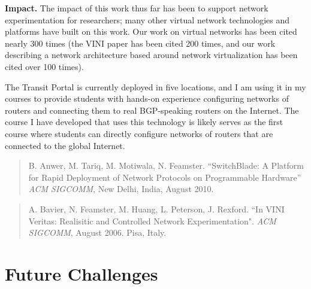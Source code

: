 {\bf Impact.}  The impact of this work thus far has been to support
network experimentation for researchers; many other virtual network
technologies and platforms have built on this work. Our work on virtual
networks has been cited nearly 300 times (the VINI paper has been cited
200 times, and our work describing a network architecture based around
network virtualization has been cited over 100 times).

The Transit Portal is currently deployed in five locations, and I am
using it in my courses to provide students with hands-on experience
configuring networks of routers and connecting them to real BGP-speaking
routers on the Internet.  The course I have developed that uses this
technology is likely serves as the first course where students can
directly configure networks of routers that are connected to the global
Internet.

\begin{quote}
B. Anwer, M. Tariq, M. Motiwala, N. Feamster. ``SwitchBlade: A Platform
for Rapid Deployment of Network Protocols on Programmable Hardware''
{\em ACM SIGCOMM}, New Delhi, India, August 2010.
\end{quote}

\begin{quote}
A. Bavier, N. Feamster, M. Huang, L. Peterson, J. Rexford. ``In VINI
Veritas: Realisitic and Controlled Network Experimentation". {\em ACM
SIGCOMM}, August 2006. Pisa, Italy.
\end{quote}





\section*{Future Challenges}

